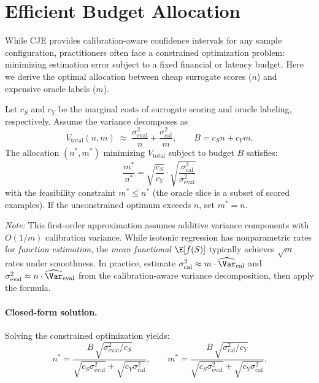 \section{Efficient Budget Allocation}
\label{app:budget}

While CJE provides calibration-aware confidence intervals for any sample configuration, practitioners often face a constrained optimization problem: minimizing estimation error subject to a fixed financial or latency budget. Here we derive the optimal allocation between cheap surrogate scores ($n$) and expensive oracle labels ($m$).

\begin{proposition}
\label{prop:sqrt-allocation}
Let $c_S$ and $c_Y$ be the marginal costs of surrogate scoring and oracle labeling, respectively. Assume the variance decomposes as
\[
V_{\mathrm{total}}(n,m)\;\approx\;\frac{\sigma^2_{\mathrm{eval}}}{n}+\frac{\sigma^2_{\mathrm{cal}}}{m},
\qquad B=c_S n+c_Y m.
\]
The allocation $(n^*, m^*)$ minimizing $V_{\mathrm{total}}$ subject to budget $B$ satisfies:
\[
\boxed{\frac{m^*}{n^*} = \sqrt{\frac{c_S}{c_Y}} \cdot \sqrt{\frac{\sigma^2_{\mathrm{cal}}}{\sigma^2_{\mathrm{eval}}}}}
\]
with the feasibility constraint $m^* \le n^*$ (the oracle slice is a subset of scored examples). If the unconstrained optimum exceeds $n$, set $m^* = n$.
\end{proposition}

\emph{Note:} This first-order approximation assumes additive variance components with $O(1/m)$ calibration variance. While isotonic regression has nonparametric rates for \emph{function estimation}, the \emph{mean functional} $\E[f(S)]$ typically achieves $\sqrt{m}$ rates under smoothness. In practice, estimate $\sigma^2_{\mathrm{cal}} \approx m \cdot \widehat{\Var}_{\mathrm{cal}}$ and $\sigma^2_{\mathrm{eval}} \approx n \cdot \widehat{\Var}_{\mathrm{eval}}$ from the calibration-aware variance decomposition, then apply the formula.

\paragraph{Closed-form solution.} Solving the constrained optimization yields:
\[
n^* = \frac{B\,\sqrt{\sigma^2_{\mathrm{eval}}/c_S}}{\sqrt{c_S\sigma^2_{\mathrm{eval}}}+\sqrt{c_Y\sigma^2_{\mathrm{cal}}}},
\qquad
m^* = \frac{B\,\sqrt{\sigma^2_{\mathrm{cal}}/c_Y}}{\sqrt{c_S\sigma^2_{\mathrm{eval}}}+\sqrt{c_Y\sigma^2_{\mathrm{cal}}}}.
\]

